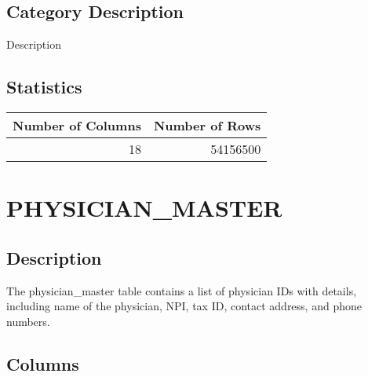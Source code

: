 \documentclass[
  letterpaper,
  DIV=11,
  numbers=noendperiod]{scrreprt}
\begin{document}
\hypertarget{category-description-32}{%
\section*{Category Description}\label{category-description-32}}

Description

\hypertarget{statistics-32}{%
\section*{Statistics}\label{statistics-32}}

\begin{longtable}{rr}
\toprule
Number of Columns & Number of Rows \\ 
\midrule
18 & 54156500 \\ 
\bottomrule
\end{longtable}

\hypertarget{physician_master}{%
\chapter*{PHYSICIAN\_MASTER}\label{physician_master}}

\hypertarget{description-33}{%
\section*{Description}\label{description-33}}

The physician\_master table contains a list of physician IDs with
details, including name of the physician, NPI, tax ID, contact address,
and phone numbers.

\hypertarget{columns-33}{%
\section*{Columns}\label{columns-33}}
\end{document}
